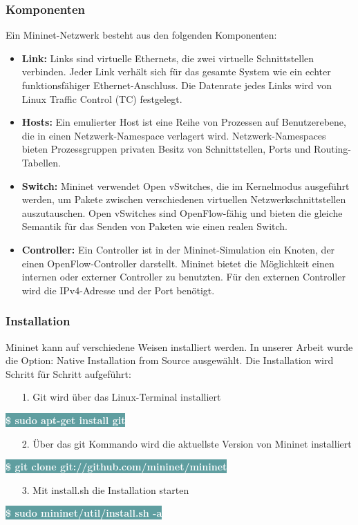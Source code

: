 \documentclass[fontsize=12pt,paper=a4,open=any,parskip=half,
  twoside=false,toc=listof,toc=bibliography,fleqn,leqno,
  captions=nooneline,captions=tableabove,british]{scrbook}
\begin{document}
\subsubsection{Komponenten}
Ein Mininet-Netzwerk besteht aus den folgenden Komponenten:
\begin{itemize}
 \item \textbf{Link:} Links sind virtuelle Ethernets, die zwei virtuelle Schnittstellen verbinden. Jeder Link verhält sich für das gesamte System wie ein echter funktionsfähiger Ethernet-Anschluss. Die Datenrate jedes Links wird von Linux Traffic Control (TC) festgelegt.
 \item \textbf{Hosts:} Ein emulierter Host ist eine Reihe von Prozessen auf Benutzerebene, die in einen Netzwerk-Namespace verlagert wird. Netzwerk-Namespaces bieten Prozessgruppen privaten Besitz von Schnittstellen, Ports und Routing-Tabellen.
 \item \textbf{Switch:} Mininet verwendet Open vSwitches, die im Kernelmodus ausgeführt werden, um Pakete zwischen verschiedenen virtuellen Netzwerkschnittstellen auszutauschen. Open vSwitches sind OpenFlow-fähig und bieten die gleiche Semantik für das Senden von Paketen wie einen realen Switch.
 \item \textbf{Controller:} Ein Controller ist in der Mininet-Simulation ein Knoten, der einen OpenFlow-Controller darstellt. Mininet bietet die Möglichkeit einen internen oder externer Controller zu benutzten. Für den externen Controller wird die IPv4-Adresse und der Port benötigt.
\end{itemize}


\subsubsection{Installation}
Mininet kann auf verschiedene Weisen installiert werden. In unserer Arbeit wurde die Option: Native Installation from Source ausgewählt. Die Installation wird Schritt für Schritt aufgeführt:
\begin{itemize}
\item[1.] Git wird über das Linux-Terminal installiert
\end{itemize}
\colorbox{CadetBlue}{\textcolor{white}{\textbf{\textsf{\$ sudo apt-get install git}}}}
\begin{itemize}
\item[2.] Über das git Kommando wird die aktuellste Version von Mininet installiert
\end{itemize}
\colorbox{CadetBlue}{\textcolor{white}{\textbf{\textsf{\$ git clone git://github.com/mininet/mininet}}}}
\begin{itemize}
\item[3.] Mit install.sh die Installation starten
\end{itemize}
\colorbox{CadetBlue}{\textcolor{white}{\textbf{\textsf{\$ sudo mininet/util/install.sh -a}}}}
\end{document}
